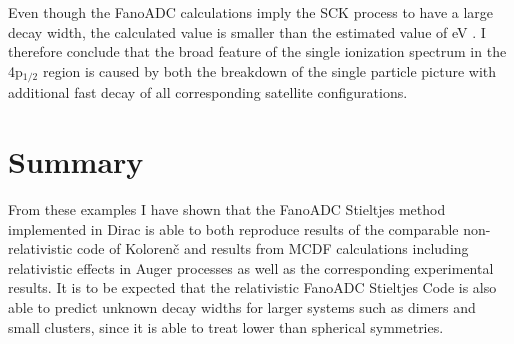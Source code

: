 Even though the FanoADC calculations imply the \ac{SCK} process to have
a large decay width, the calculated value is smaller than the estimated
value of \unit[10--100]{eV} \cite{Heinaesmaeki04}.
I therefore conclude that the broad
feature of the single ionization spectrum in the 4p$_{1/2}$ region is caused
by both the breakdown of the single particle picture with additional fast decay
of all corresponding satellite configurations.


\section{Summary}
From these examples I have shown that the FanoADC Stieltjes method implemented
in Dirac is able to both reproduce results of the comparable non-relativistic
code of Koloren\v{c}  and results from \ac{MCDF} calculations
including relativistic effects in Auger processes as well as the corresponding
experimental results.
It is to be expected that the relativistic FanoADC Stieltjes Code is also able
to predict unknown decay widths for larger systems such as dimers and small
clusters, since it is able to treat lower than spherical symmetries.
